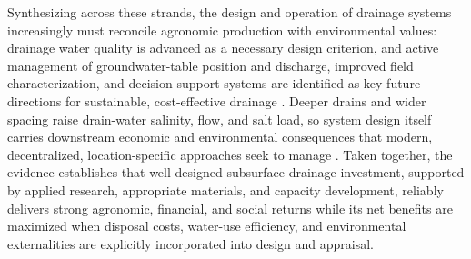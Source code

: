 \documentclass[11pt]{article}
\begin{document}
Synthesizing across these strands, the design and operation of drainage systems increasingly must reconcile agronomic production with environmental values: drainage water quality is advanced as a necessary design criterion, and active management of groundwater-table position and discharge, improved field characterization, and decision-support systems are identified as key future directions for sustainable, cost-effective drainage \parencite{Ayars2015}. Deeper drains and wider spacing raise drain-water salinity, flow, and salt load, so system design itself carries downstream economic and environmental consequences that modern, decentralized, location-specific approaches seek to manage \parencite{Yannopoulos2020,Ritzema2023}. Taken together, the evidence establishes that well-designed subsurface drainage investment, supported by applied research, appropriate materials, and capacity development, reliably delivers strong agronomic, financial, and social returns while its net benefits are maximized when disposal costs, water-use efficiency, and environmental externalities are explicitly incorporated into design and appraisal.

\printbibliography
\end{document}
